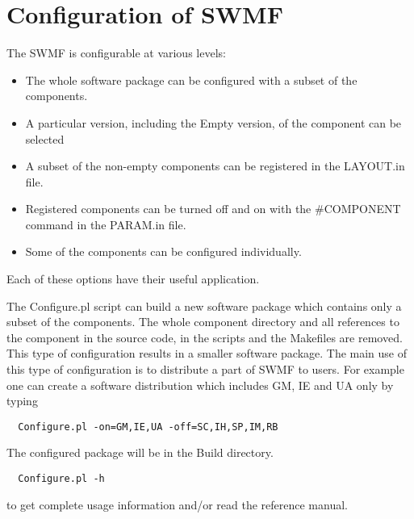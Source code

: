 \section{Configuration of SWMF}

The SWMF is configurable at various levels:
\begin{itemize}
\item The whole software package can be configured %
      with a subset of the components.             %
\item A particular version, including the Empty version,
      of the component can be selected
\item A subset of the non-empty components can be registered in 
      the LAYOUT.in file.
\item Registered components can be turned off and on with the \#COMPONENT
      command in the PARAM.in file.
\item Some of the components can be configured individually.
\end{itemize}
Each of these options have their useful application.

The Configure.pl script can build a new software package which
contains only a subset of the components. The whole
component directory and all references to the component 
in the source code, in the scripts and the Makefiles are removed.
This type of configuration results in a smaller software package.
The main use of this type of configuration is to distribute
a part of SWMF to users. For example one can create a 
software distribution which includes GM, IE and UA only by typing
\begin{verbatim}
  Configure.pl -on=GM,IE,UA -off=SC,IH,SP,IM,RB
\end{verbatim}
The configured package will be in the Build directory.
\begin{verbatim}
  Configure.pl -h
\end{verbatim}
to get complete usage information and/or read the reference manual.


